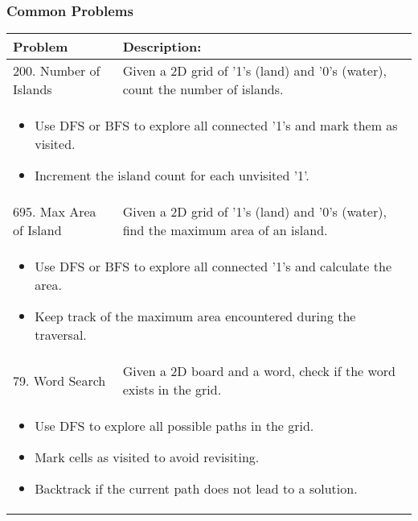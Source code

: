 \subsubsection{Common Problems}
\begin{summary}
    \begin{center}
        \begin{tabular}{ll}
            \toprule
            \textbf{Problem} & \textbf{Description:} \\
            \midrule
            200. Number of Islands & Given a 2D grid of '1's (land) and '0's (water), count the number of islands. \\
            \multicolumn{2}{p{\linewidth}}{
                \begin{itemize}
                    \item Use DFS or BFS to explore all connected '1's and mark them as visited.
                    \item Increment the island count for each unvisited '1'.
                \end{itemize}
            } \\
            \midrule
            695. Max Area of Island & Given a 2D grid of '1's (land) and '0's (water), find the maximum area of an island. \\
            \multicolumn{2}{p{\linewidth}}{
                \begin{itemize}
                    \item Use DFS or BFS to explore all connected '1's and calculate the area.
                    \item Keep track of the maximum area encountered during the traversal.
                \end{itemize}
            } \\
            \midrule
            79. Word Search & Given a 2D board and a word, check if the word exists in the grid. \\
            \multicolumn{2}{p{\linewidth}}{
                \begin{itemize}
                    \item Use DFS to explore all possible paths in the grid.
                    \item Mark cells as visited to avoid revisiting.
                    \item Backtrack if the current path does not lead to a solution.
                \end{itemize}
            } \\
        \end{tabular}
    \end{center}
\end{summary}
\newpage

